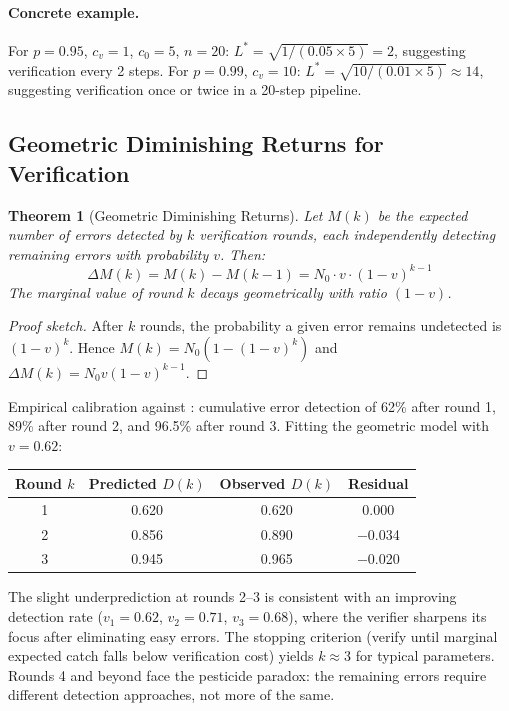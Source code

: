 \documentclass[11pt, a4paper, logo, copyright]{googledeepmind}
\newtheorem{theorem}{Theorem}[section]
\begin{document}
\paragraph{Concrete example.} For $p = 0.95$, $c_v = 1$, $c_0 = 5$, $n = 20$: $L^* = \sqrt{1/(0.05 \times 5)} = 2$, suggesting verification every 2 steps. For $p = 0.99$, $c_v = 10$: $L^* = \sqrt{10/(0.01 \times 5)} \approx 14$, suggesting verification once or twice in a 20-step pipeline.

\subsection{Geometric Diminishing Returns for Verification}

\begin{theorem}[Geometric Diminishing Returns]
\label{thm:diminishing-returns}
Let $M(k)$ be the expected number of errors detected by $k$ verification rounds, each independently detecting remaining errors with probability $v$. Then:
\begin{equation}
    \Delta M(k) = M(k) - M(k-1) = N_0 \cdot v \cdot (1-v)^{k-1}
\end{equation}
The marginal value of round $k$ decays geometrically with ratio $(1-v)$.
\end{theorem}

\begin{proof}[Proof sketch]
After $k$ rounds, the probability a given error remains undetected is $(1-v)^k$. Hence $M(k) = N_0(1 - (1-v)^k)$ and $\Delta M(k) = N_0 v (1-v)^{k-1}$.
\end{proof}

Empirical calibration against \citet{hariharan2025plan}: cumulative error detection of 62\% after round 1, 89\% after round 2, and 96.5\% after round 3. Fitting the geometric model with $v = 0.62$:

\begin{center}
\small
\begin{tabular}{cccc}
\toprule
Round $k$ & Predicted $D(k)$ & Observed $D(k)$ & Residual \\
\midrule
1 & 0.620 & 0.620 & 0.000 \\
2 & 0.856 & 0.890 & $-$0.034 \\
3 & 0.945 & 0.965 & $-$0.020 \\
\bottomrule
\end{tabular}
\end{center}

The slight underprediction at rounds 2--3 is consistent with an improving detection rate ($v_1 = 0.62$, $v_2 = 0.71$, $v_3 = 0.68$), where the verifier sharpens its focus after eliminating easy errors. The stopping criterion (verify until marginal expected catch falls below verification cost) yields $k \approx 3$ for typical parameters. Rounds 4 and beyond face the pesticide paradox: the remaining errors require different detection approaches, not more of the same.
\end{document}
